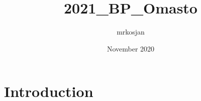 \documentclass{article}
\title{2021_BP_Omasto}
\author{mrkosjan }
\date{November 2020}
\begin{document}
\maketitle

\section{Introduction}
\end{document}
